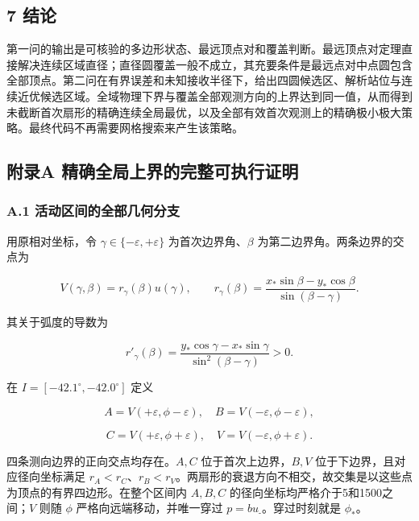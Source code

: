 \documentclass[
  11pt,
  fontset=none]{ctexart}
\begin{document}
\subsection{7 结论}\label{ux7ed3ux8bba}

第一问的输出是可核验的多边形状态、最远顶点对和覆盖判断。最远顶点对定理直接解决连续区域直径；直径圆覆盖一般不成立，其充要条件是最远点对中点圆包含全部顶点。第二问在有界误差和未知接收半径下，给出四圆候选区、解析站位与连续近优候选区域。全域物理下界与覆盖全部观测方向的上界达到同一值，从而得到未截断首次扇形的精确连续全局最优，以及全部有效首次观测上的精确极小极大策略。最终代码不再需要网格搜索来产生该策略。

\subsection{附录A
精确全局上界的完整可执行证明}\label{ux9644ux5f55a-ux7cbeux786eux5168ux5c40ux4e0aux754cux7684ux5b8cux6574ux53efux6267ux884cux8bc1ux660e}

\subsubsection{A.1
活动区间的全部几何分支}\label{a.1-ux6d3bux52a8ux533aux95f4ux7684ux5168ux90e8ux51e0ux4f55ux5206ux652f}

用原相对坐标，令 \(\gamma\in\{-\varepsilon,+\varepsilon\}\)
为首次边界角、\(\beta\) 为第二边界角。两条边界的交点为

\[
V(\gamma,\beta)=r_\gamma(\beta)u(\gamma),\qquad
r_\gamma(\beta)=\frac{x_{\text{*}}\sin\beta-y_{\text{*}}\cos\beta}{\sin(\beta-\gamma)}. \tag{A1}
\]

其关于弧度的导数为

\[
r'_\gamma(\beta)=\frac{y_{\text{*}}\cos\gamma-x_{\text{*}}\sin\gamma}{\sin^2(\beta-\gamma)}>0. \tag{A2}
\]

在 \(I=[-42.1^\circ,-42.0^\circ]\) 定义

\[
A=V(+\varepsilon,\phi-\varepsilon),\quad B=V(-\varepsilon,\phi-\varepsilon),
\]

\[
C=V(+\varepsilon,\phi+\varepsilon),\quad V=V(-\varepsilon,\phi+\varepsilon).
\]

四条测向边界的正向交点均存在。\(A,C\) 位于首次上边界，\(B,V\)
位于下边界，且对应径向坐标满足
\(r_A<r_C\)、\(r_B<r_V\)。两扇形的衰退方向不相交，故交集是以这些点为顶点的有界四边形。在整个区间内
\(A,B,C\) 的径向坐标均严格介于5和1500之间；\(V\) 则随 \(\phi\)
严格向远端移动，并唯一穿过 \(p=bu_{\text{-}}\)。穿过时刻就是
\(\phi_{\text{*}}\)。
\end{document}
